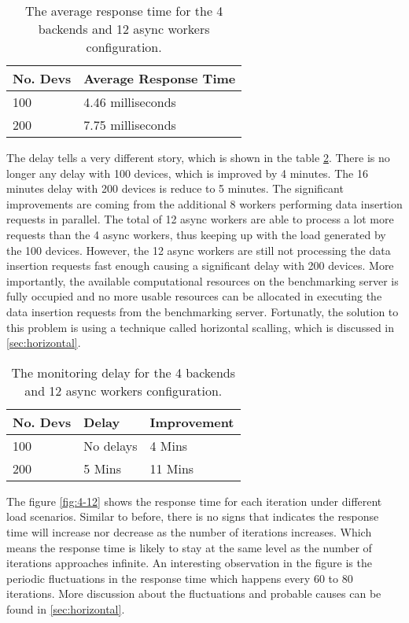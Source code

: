 \documentclass[../thesis.tex]{subfiles}
\begin{document}
\begin{table}[h!]
	\begin{center}
		\caption{The average response time for the 4 backends and 12 async workers configuration.}
		\label{tab:avg4-12}
		\begin{tabular}{l|l}
			\toprule
			\textbf{No. Devs} & \textbf{Average Response Time}\\
			\midrule
			100 & 4.46 milliseconds\\
			200 & 7.75 milliseconds\\
			\bottomrule
		\end{tabular}
	\end{center}
\end{table}

The delay tells a very different story, which is shown in the table \ref{tab:delay4-12}. There is no longer any delay with 100 devices, which is improved by 4 minutes. The 16 minutes delay with 200 devices is reduce to 5 minutes. The significant improvements are coming from the additional 8 workers performing data insertion requests in parallel. The total of 12 async workers are able to process a lot more requests than the 4 async workers, thus keeping up with the load generated by the 100 devices. However, the 12 async workers are still not processing the data insertion requests fast enough causing a significant delay with 200 devices. More importantly, the available computational resources on the benchmarking server is fully occupied and no more usable resources can be allocated in executing the data insertion requests from the benchmarking server. Fortunatly, the solution to this problem is using a technique called horizontal scalling, which is discussed in \autoref{sec:horizontal}. 

\begin{table}[h!]
	\begin{center}
		\caption{The monitoring delay for the 4 backends and 12 async workers configuration.}
		\label{tab:delay4-12}
		\begin{tabular}{l|l|l}
			\toprule
			\textbf{No. Devs} & \textbf{Delay} & \textbf{Improvement}\\
			\midrule
			100 & No delays & 4 Mins	\\
			200 & 5 Mins & 11 Mins\\
			\bottomrule
		\end{tabular}
	\end{center}
\end{table}

The figure \ref{fig:4-12} shows the response time for each iteration under different load scenarios. Similar to before, there is no signs that indicates the response time will increase nor decrease as the number of iterations increases. Which means the response time is likely to stay at the same level as the number of iterations approaches infinite. An interesting observation in the figure is the periodic fluctuations in the response time which happens every 60 to 80 iterations. More discussion about the fluctuations and probable causes can be found in \autoref{sec:horizontal}.
\end{document}

